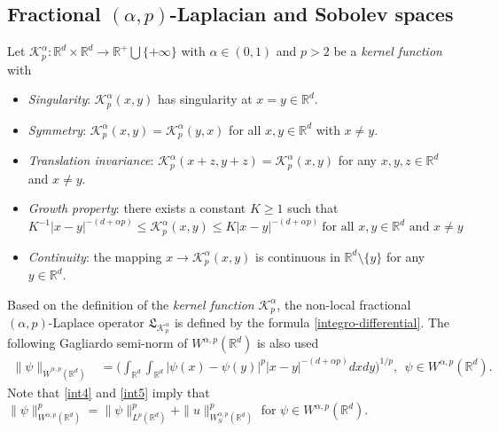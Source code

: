 \documentclass[11pt]{article}
\renewcommand{\leq}{\leqslant}
\renewcommand{\geq}{\geqslant}  %
\numberwithin{equation}{section}
\begin{document}
\subsection{Fractional
$(\alpha,p)$-Laplacian and
Sobolev spaces
}Let
 $\mathcal{K}_{p}^\alpha:\mathbb{R}^d\times\mathbb{R}^d\rightarrow\mathbb{R}^+\bigcup{\{+\infty\}}$ with $\alpha\in(0,1)$ and $p>2$
be a \emph{kernel function} with
\begin{itemize}
  \item \emph{Singularity}: $\mathcal{K}_{p}^\alpha(x,y)$
  has singularity at $x=y\in\mathbb{R}^d$.
  \item \emph{Symmetry}: $\mathcal{K}_{p}^\alpha(x,y)=
      \mathcal{K}_{p}^\alpha(y,x)$ for all $x,y\in\mathbb{R}^d$ with $x\neq y$.
  \item \emph{Translation invariance}: $\mathcal{K}_{p}^\alpha(x+z,y+z)=
      \mathcal{K}_{p}^\alpha(x,y)$ for any $x,y,z\in\mathbb{R}^d$ and $x\neq y$.
  \item \emph{Growth property}: there exists a constant $K\geq1$ such that
   $$
   K^{-1}|x-y|^{-(d+\alpha p)}\leq \mathcal{K}_{p}^\alpha(x,y)\leq
   K|x-y|^{-(d+\alpha p)}\ \mbox{for all $x,y\in\mathbb{R}^d$ and $x\neq y$}
   $$
  \item \emph{Continuity}: the mapping $x\rightarrow \mathcal{K}_{p}^\alpha(x,y)$ is continuous in $\mathbb{R}^d\setminus \{y\}$ for any $y\in\mathbb{R}^d$.
\end{itemize}
Based on the definition of the
\emph{kernel function} $\mathcal{K}_{p}^\alpha$,
the non-local fractional $(\alpha,p)$-Laplace
operator $\mathfrak{L}_{\mathcal{K}_{p}^\alpha}$ is defined by the formula \eqref{integro-differential}.
The following Gagliardo semi-norm of $W^{\alpha,p}(\mathbb{R}^d)$ is also used
\begin{align}\label{int5}
\|\psi\|_{\dot{W} ^{\alpha,p}(\mathbb{R}^d)}&=
\Bigg(\int_{\mathbb{R}^d}
\int_{\mathbb{R}^d}|\psi(x)-
\psi(y)|^p|x-y|^{-(d+\alpha p)}
dxdy \Bigg)^{1/p},\ \ \psi\in W^{\alpha,p}(\mathbb{R}^d).
\end{align}
Note that \eqref{int4} and \eqref{int5}
imply that
$
\|\psi\|^p_{W^{\alpha,p}(\mathbb{R}^d)}=
 \|\psi\|_{L^{p}(\mathbb{R}^d)}^p+\|u
 \|^p_{W_S^{\alpha,p}(\mathbb{R}^d)}
$
for $\psi\in W^{\alpha,p}(\mathbb{R}^d)$.
\end{document}
